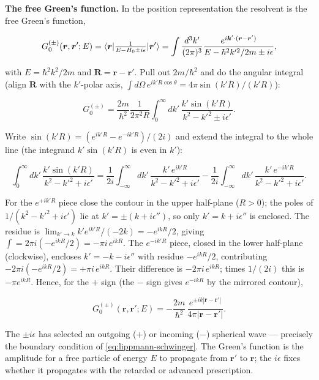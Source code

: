 \medskip\noindent\textbf{The free Green's function.}
In the position representation the resolvent is the free Green's function,
\begin{linenomath}
\begin{equation*}
G_{0}^{(\pm)}(\bm r,\bm r';E)=\braket{\bm r|\tfrac{1}{E-H_{0}\pm i\epsilon}|\bm r'}
=\int\frac{d^{3}k'}{(2\pi)^{3}}\frac{e^{i\bm k'\cdot(\bm r-\bm r')}}{E-\hbar^{2}k'^{2}/2m\pm i\epsilon},
\end{equation*}
\end{linenomath}
with $E=\hbar^{2}k^{2}/2m$ and $\bm R=\bm r-\bm r'$. Pull out $2m/\hbar^{2}$ and do the angular integral (align $\bm R$ with the $k'$-polar axis, $\int d\Omega\,e^{ik'R\cos\theta}=4\pi\sin(k'R)/(k'R)$):
\begin{linenomath}
\begin{equation*}
G_{0}^{(\pm)}=\frac{2m}{\hbar^{2}}\frac{1}{2\pi^{2}R}\int_{0}^{\infty}\!dk'\,\frac{k'\sin(k'R)}{k^{2}-k'^{2}\pm i\epsilon'}.
\end{equation*}
\end{linenomath}
Write $\sin(k'R)=(e^{ik'R}-e^{-ik'R})/(2i)$ and extend the integral to the whole line (the integrand $k'\sin(k'R)$ is even in $k'$):
\begin{linenomath}
\begin{equation*}
\int_{0}^{\infty}\!dk'\,\frac{k'\sin(k'R)}{k^{2}-k'^{2}+i\epsilon'}=\frac{1}{2i}\int_{-\infty}^{\infty}\!dk'\,\frac{k'\,e^{ik'R}}{k^{2}-k'^{2}+i\epsilon'}-\frac{1}{2i}\int_{-\infty}^{\infty}\!dk'\,\frac{k'\,e^{-ik'R}}{k^{2}-k'^{2}+i\epsilon'}.
\end{equation*}
\end{linenomath}
For the $e^{+ik'R}$ piece close the contour in the upper half-plane ($R>0$); the poles of $1/(k^{2}-k'^{2}+i\epsilon')$ lie at $k'=\pm(k+i\epsilon'')$, so only $k'=k+i\epsilon''$ is enclosed. The residue is $\lim_{k'\to k}k'e^{ik'R}/(-2k)=-e^{ikR}/2$, giving $\int=2\pi i(-e^{ikR}/2)=-\pi i\,e^{ikR}$. The $e^{-ik'R}$ piece, closed in the lower half-plane (clockwise), encloses $k'=-k-i\epsilon''$ with residue $-e^{ikR}/2$, contributing $-2\pi i(-e^{ikR}/2)=+\pi i\,e^{ikR}$. Their difference is $-2\pi i\,e^{ikR}$; times $1/(2i)$ this is $-\pi e^{ikR}$. Hence, for the $+$ sign (the $-$ sign gives $e^{-ikR}$ by the mirrored contour),
\begin{linenomath}
\begin{equation}
G_{0}^{(\pm)}(\bm r,\bm r';E)=-\frac{2m}{\hbar^{2}}\,\frac{e^{\pm ik|\bm r-\bm r'|}}{4\pi|\bm r-\bm r'|}.
\label{eq:free-green}
\end{equation}
\end{linenomath}
The $\pm i\epsilon$ has selected an outgoing ($+$) or incoming ($-$) spherical wave --- precisely the boundary condition of \eqref{eq:lippmann-schwinger}. The Green's function is the amplitude for a free particle of energy $E$ to propagate from $\bm r'$ to $\bm r$; the $i\epsilon$ fixes whether it propagates with the retarded or advanced prescription.

